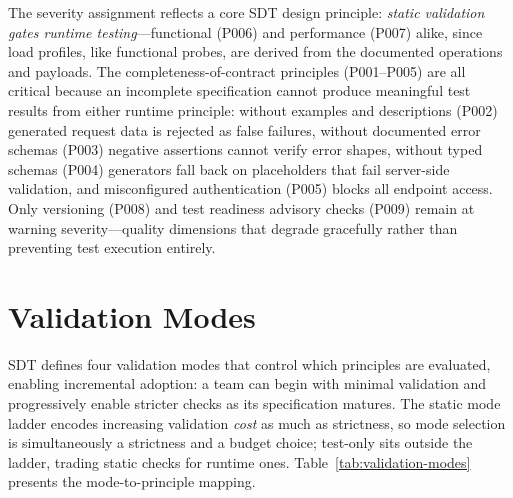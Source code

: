 The severity assignment reflects a core SDT design principle: \textit{static validation gates runtime testing}---functional (P006) and performance (P007) alike, since load profiles, like functional probes, are derived from the documented operations and payloads. The completeness-of-contract principles (P001--P005) are all critical because an incomplete specification cannot produce meaningful test results from either runtime principle: without examples and descriptions (P002) generated request data is rejected as false failures, without documented error schemas (P003) negative assertions cannot verify error shapes, without typed schemas (P004) generators fall back on placeholders that fail server-side validation, and misconfigured authentication (P005) blocks all endpoint access. Only versioning (P008) and test readiness advisory checks (P009) remain at warning severity---quality dimensions that degrade gracefully rather than preventing test execution entirely.

\section{Validation Modes}
\label{sec:validation-modes}

SDT defines four validation modes that control which principles are evaluated, enabling incremental adoption: a team can begin with minimal validation and progressively enable stricter checks as its specification matures. The static mode ladder encodes increasing validation \emph{cost} as much as strictness, so mode selection is simultaneously a strictness and a budget choice; test-only sits outside the ladder, trading static checks for runtime ones. Table~\ref{tab:validation-modes} presents the mode-to-principle mapping.

